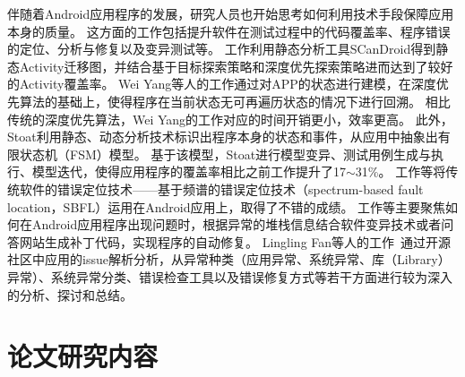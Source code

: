 伴随着Android应用程序的发展，研究人员也开始思考如何利用技术手段保障应用本身的质量。
这方面的工作包括提升软件在测试过程中的代码覆盖率\cite{azim2013targeted,yang2013grey,su2016fsmdroid,androidtest2}、程序错误的定位、分析与修复\cite{mirzaei2015exception,machado2013mzoltar,tan2018repairing,QingGaoASE15}以及变异测试\cite{MutationOperatorsAndroid,deng2015towards,linares2017enabling}等。
工作\cite{azim2013targeted}利用静态分析工具SCanDroid得到静态Activity迁移图，并结合基于目标探索策略和深度优先探索策略进而达到了较好的Activity覆盖率。
Wei Yang等人的工作\cite{yang2013grey}通过对APP的状态进行建模，在深度优先算法的基础上，使得程序在当前状态无可再遍历状态的情况下进行回溯。
相比传统的深度优先算法，Wei Yang的工作对应的时间开销更小，效率更高。
此外，Stoat\cite{su2016fsmdroid,androidtest2}利用静态、动态分析技术标识出程序本身的状态和事件，从应用中抽象出有限状态机（FSM）模型。
基于该模型，Stoat进行模型变异、测试用例生成与执行、模型迭代，使得应用程序的覆盖率相比之前工作\cite{hao2014puma,amalfitano2015mobiguitar}提升了17$\sim$31\%。
工作\cite{mirzaei2015exception,machado2013mzoltar}等将传统软件的错误定位技术——基于频谱的错误定位技术（spectrum-based fault location，SBFL）运用在Android应用上，取得了不错的成绩。
工作\cite{tan2018repairing,QingGaoASE15}等主要聚焦如何在Android应用程序出现问题时，根据异常的堆栈信息结合软件变异技术或者问答网站生成补丁代码，实现程序的自动修复。
Lingling Fan等人的工作~\cite{fan2018large}通过开源社区中应用的issue解析分析，从异常种类（应用异常、系统异常、库（Library）异常）、系统异常分类、错误检查工具以及错误修复方式等若干方面进行较为深入的分析、探讨和总结。




\section{论文研究内容}

